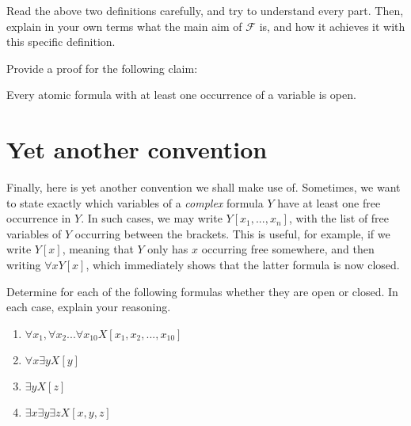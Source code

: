 \begin{exc}
Read the above two definitions carefully, and try to understand every part. Then, explain in your own terms what the main aim of $\mathcal{F}$ is, and how it achieves it with this specific definition. 
\end{exc}

\begin{defn}
Provide a proof for the following claim: 
\begin{center}Every atomic formula with at least one occurrence of a variable is open.
	\end{center}
\end{defn}

\section{Yet another convention}

Finally, here is yet another convention we shall make use of. Sometimes, we want to state exactly which variables of a \textit{complex} formula $Y$ have at least one free occurrence in $Y$. In such cases, we may write $Y[x_1, ..., x_n]$, with the list of free variables of $Y$ occurring between the brackets. This is useful, for example, if we write $Y[x]$, meaning that $Y$ only has $x$ occurring free somewhere, and then writing $\forall x Y[x]$, which immediately shows that the latter formula is now closed. 

\begin{exc}
Determine for each of the following formulas whether they are open or closed. In each case, explain your reasoning. 

\begin{enumerate}
	\item $\forall x_1, \forall x_2 ... \forall x_{10} X[x_1, x_2, ..., x_{10}]$
	\item $\forall x \exists y X[y]$
	\item $\exists y X[z]$
	\item $\exists x \exists y \exists z X[x, y, z]$
\end{enumerate}
\end{exc}